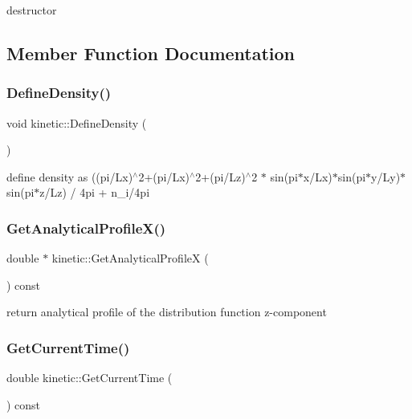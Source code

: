 destructor 



\subsection{Member Function Documentation}
\mbox{\label{classkinetic_a81e02890b75dcffc4a9e2053a4617877}} 
\subsubsection{\texorpdfstring{Define\+Density()}{DefineDensity()}}
{\footnotesize\ttfamily void kinetic\+::\+Define\+Density (\begin{DoxyParamCaption}{ }\end{DoxyParamCaption})}



define density as ((pi/\+Lx)$^\wedge$2+(pi/\+Lx)$^\wedge$2+(pi/\+Lz)$^\wedge$2 $\ast$ sin(pi$\ast$x/\+Lx)$\ast$sin(pi$\ast$y/\+Ly)$\ast$sin(pi$\ast$z/\+Lz) / 4pi + n\+\_\+i/4pi 

\mbox{\label{classkinetic_aecfcf87f283eb405fcfda20e40bb9868}} 
\subsubsection{\texorpdfstring{Get\+Analytical\+Profile\+X()}{GetAnalyticalProfileX()}}
{\footnotesize\ttfamily double $\ast$ kinetic\+::\+Get\+Analytical\+ProfileX (\begin{DoxyParamCaption}{ }\end{DoxyParamCaption}) const}



return analytical profile of the distribution function z-\/component 

\mbox{\label{classkinetic_af8c37c8a479f30dc2f5a5a25cd4b37b0}} 
\subsubsection{\texorpdfstring{Get\+Current\+Time()}{GetCurrentTime()}}
{\footnotesize\ttfamily double kinetic\+::\+Get\+Current\+Time (\begin{DoxyParamCaption}{ }\end{DoxyParamCaption}) const}



